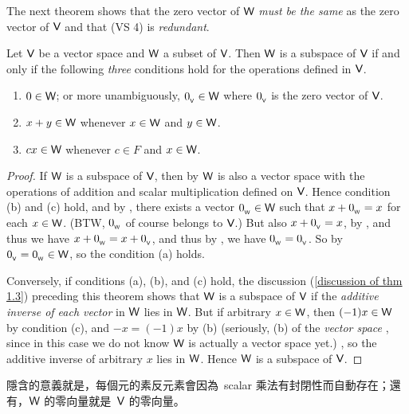 The next theorem shows that the zero vector of \(\textsf{W}\) \emph{must be the same} as the zero vector of \(\textsf{V}\) and that (VS 4) is \emph{redundant}.

\begin{theorem} \label{thm 1.3}
Let \(\textsf{V}\) be a vector space and \(\textsf{W}\) a subset of \(\textsf{V}\).
Then \(\textsf{W}\) is a subspace of \(\textsf{V}\) if and only if the following \emph{three} conditions hold for the operations defined in \(\textsf{V}\).
\begin{enumerate}
    \item \(0 \in \textsf{W}\); or more unambiguously, \(0_{_{\textsf{V}}} \in \textsf{W}\) where \(0_{_{\textsf{V}}}\) is the zero vector of \(\textsf{V}\).
    \item \(x + y \in \textsf{W}\) whenever \(x \in \textsf{W}\) and \(y \in \textsf{W}\).
    \item \(cx \in \textsf{W}\) whenever \(c \in F\) and \(x \in \textsf{W}\).
\end{enumerate}
\end{theorem}

\begin{proof}
If \(\textsf{W}\) is a subspace of \(\textsf{V}\), then by  \(\textsf{W}\) is also a vector space with the operations of addition and scalar multiplication defined on \(\textsf{V}\).
Hence condition (b) and (c) hold, and by , there exists a vector \(0_{_{\textsf{W}}} \in \textsf{W}\)  such that \(x + 0_{_{\textsf{W}}} = x\) for each \(x \in \textsf{W}\).
(BTW, \(0_{_{\textsf{W}}}\) of course belongs to \(\textsf{V}\).)
But also \(x + 0_{_{\textsf{V}}} = x\), by , and thus we have \(x + 0_{_{\textsf{W}}} = x + 0_{_{\textsf{V}}}\), and thus by , we have \(0_{_{\textsf{W}}} = 0_{_{\textsf{V}}}\).
So by  \(0_{_{\textsf{V}}} = 0_{_{\textsf{W}}} \in \textsf{W}\), so the condition (a) holds.

Conversely, if conditions (a), (b), and (c) hold, the discussion  (\ref{discussion of thm 1.3}) preceding this theorem shows that \(\textsf{W}\) is a subspace of \(\textsf{V}\) if the \emph{additive inverse of each vector} in \(\textsf{W}\) lies in \(\textsf{W}\).
But if arbitrary \(x \in \textsf{W}\), then \((-1)x \in \textsf{W}\) by condition (c), and \(-x = (-1)x\) by (b)
(seriously, (b) of the \emph{vector space} \V, since in this case we do not know \(\textsf{W}\) is actually a vector space yet.)
, so the additive inverse of arbitrary \(x\) lies in \(\textsf{W}\).
Hence \(\textsf{W}\) is a subspace of \(\textsf{V}\).
\end{proof}

\begin{note}
 隱含的意義就是，每個元的素反元素會因為\ scalar 乘法有封閉性而自動存在；還有，\(\textsf{W}\) 的零向量就是\ \(\textsf{V}\) 的零向量。
\end{note}


